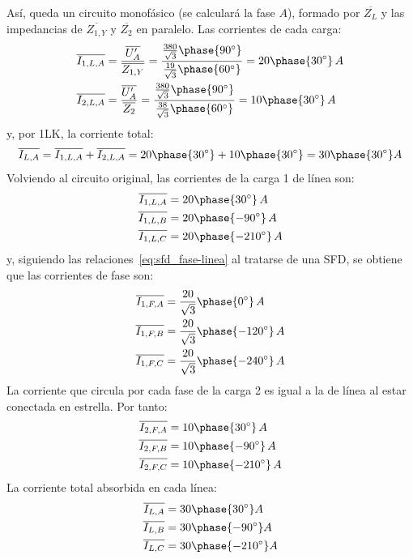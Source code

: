 \begin{example}
		Así, queda un circuito monofásico (se calculará la fase $A$), formado por $\overline{Z_L}$ y las impedancias de $\overline{Z_{1,Y}}$ y $\overline{Z_2}$ en paralelo. Las corrientes de cada carga:
		\begin{align*}
		    \overline{I_{1,L,A}}&=\dfrac{\overline{U_A'}}{\overline{Z_{1,Y}}}=\dfrac{\frac{380}{\sqrt{3}}\phase{90^\circ}}{\frac{19}{\sqrt{3}}\phase{60^\circ}}=20\phase{30^\circ}\,A\\
		    \overline{I_{2,L,A}}&=\dfrac{\overline{U_A'}}{\overline{Z_{2}}}=\dfrac{\frac{380}{\sqrt{3}}\phase{90^\circ}}{\frac{38}{\sqrt{3}}\phase{60^\circ}}=10\phase{30^\circ}\,A
		\end{align*}
		y, por 1LK, la corriente total:
		\begin{equation*}
		    \overline{I_{L,A}}=\overline{I_{1,L,A}}+\overline{I_{2,L,A}}=20\phase{30^\circ}+10\phase{30^\circ}=30\phase{30^\circ} A
		\end{equation*}
		Volviendo al circuito original, las corrientes de la carga 1 de línea son:
		\begin{align*}
		    \overline{I_{1,L,A}}&=20\phase{30^\circ}\,A\\
		    \overline{I_{1,L,B}}&=20\phase{-90^\circ}\,A\\
		    \overline{I_{1,L,C}}&=20\phase{-210^\circ}\,A\\
		\end{align*}
		y, siguiendo las relaciones~\eqref{eq:sfd_fase-linea} al tratarse de una SFD, se obtiene que las corrientes de fase son: 
		\begin{align*}
		    \overline{I_{1,F,A}}&=\dfrac{20}{\sqrt{3}}\phase{0^\circ}\,A\\
		    \overline{I_{1,F,B}}&=\dfrac{20}{\sqrt{3}}\phase{-120^\circ}\,A\\
		    \overline{I_{1,F,C}}&=\dfrac{20}{\sqrt{3}}\phase{-240^\circ}\,A\\
		\end{align*}
		La corriente que circula por cada fase de la carga 2 es igual a la de línea al estar conectada en estrella. Por tanto:
		\begin{align*}
		    \overline{I_{2,F,A}}&=10\phase{30^\circ}\,A\\
		    \overline{I_{2,F,B}}&=10\phase{-90^\circ}\,A\\
		    \overline{I_{2,F,C}}&=10\phase{-210^\circ}\,A
		\end{align*}
		La corriente total absorbida en cada línea:
		\begin{align*}
		    \overline{I_{L,A}}&=30\phase{30^\circ} A\\
		    \overline{I_{L,B}}&=30\phase{-90^\circ} A\\
		    \overline{I_{L,C}}&=30\phase{-210^\circ} A\\
		\end{align*}
		

\end{example}
